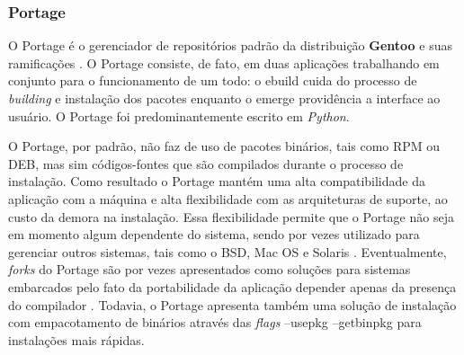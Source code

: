 \subsubsection{Portage} %
\label{ssub:emerge}

O Portage é  o gerenciador de repositórios padrão da distribuição \textbf{Gentoo} e suas ramificações \cite{vermeulen2005gentoo}. O Portage consiste, de fato, em duas aplicações trabalhando em conjunto para o funcionamento de um todo: o {\code ebuild} cuida do processo de \textit{building} e instalação dos pacotes enquanto o {\code emerge} providência a interface ao usuário. O Portage foi predominantemente escrito em \textit{Python}.

O Portage, por padrão, não faz de uso de pacotes binários, tais como RPM ou DEB, mas sim códigos-fontes que são compilados durante o processo de instalação. Como resultado o Portage mantém uma alta compatibilidade da aplicação com a máquina e alta flexibilidade com as arquiteturas de suporte, ao custo da demora na instalação.
Essa flexibilidade permite que o Portage não seja em momento algum dependente do sistema, sendo por vezes utilizado para gerenciar outros sistemas, tais como o BSD, Mac OS e Solaris \cite{ryan2010linux}.
Eventualmente, \textit{forks} do Portage são por vezes apresentados como soluções para sistemas embarcados pelo fato da portabilidade da aplicação depender apenas da presença do compilador \cite{guointegrated}. Todavia, o Portage apresenta também uma solução de instalação com empacotamento de binários através das \textit{flags} {\code --usepkg --getbinpkg} \cite{gentoo-doc}  para instalações mais rápidas.